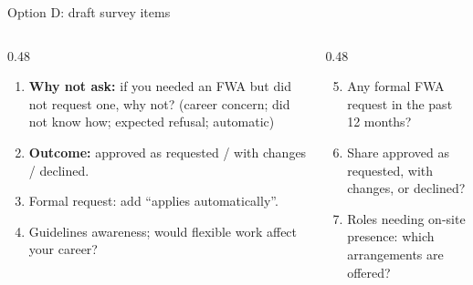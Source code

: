 \begin{frame}[t,label=B-optD-items]{Option D: draft survey items}
  \FrameTop
  \begin{columns}[T,onlytextwidth]
    \begin{column}{0.48\textwidth}
      \begin{enumerate}\setlength{\itemsep}{0.08cm}
        \item \textbf{Why not ask:} if you needed an FWA but did not request one, why not? (career concern; did not know how; expected refusal; automatic)
        \item \textbf{Outcome:} approved as requested / with changes / declined.
      \end{enumerate}
      \vspace{0.12cm}
      \begin{enumerate}\setcounter{enumi}{2}\setlength{\itemsep}{0.08cm}
        \item Formal request: add ``applies automatically''.
        \item Guidelines awareness; would flexible work affect your career?
      \end{enumerate}
    \end{column}
    \begin{column}{0.48\textwidth}
      \begin{enumerate}\setcounter{enumi}{4}\setlength{\itemsep}{0.08cm}
        \item Any formal FWA request in the past 12 months?
        \item Share approved as requested, with changes, or declined?
        \item Roles needing on-site presence: which arrangements are offered?
      \end{enumerate}
    \end{column}
  \end{columns}
\end{frame}

